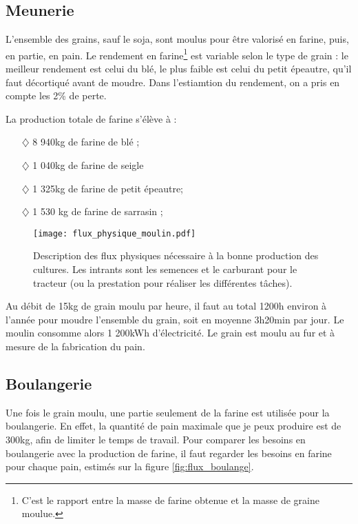 \documentclass{book}
\begin{document}
\subsection{Meunerie}

L'ensemble des grains, sauf le soja, sont moulus pour être valorisé en farine, puis, en partie, en pain. Le rendement en farine\footnote{C'est le rapport entre la masse de farine obtenue et la masse de graine moulue.} est variable selon le type de grain : le meilleur rendement est celui du blé, le plus faible est celui du petit épeautre, qu'il faut décortiqué avant de moudre. Dans l'estiamtion du rendement, on a pris en compte les 2\% de perte.

La production totale de farine s'élève à :
\begin{itemize}

\item[$\diamondsuit$] 8 940kg de farine de blé ; 
\item[$\diamondsuit$] 1 040kg de farine de seigle
\item[$\diamondsuit$] 1 325kg de farine de petit épeautre; 
\item[$\diamondsuit$] 1 530 kg de farine de sarrasin ; 

\end{itemize}

\begin{figure}[h!]
\begin{center}
	\texttt{[image: flux\_physique\_moulin.pdf]}
	\caption{Description des flux physiques nécessaire à la bonne production des cultures. Les intrants sont les semences et le carburant pour le tracteur (ou la prestation pour réaliser les différentes tâches).}
	\label{fig:flux_moulin}
\end{center}
\end{figure}

Au débit de 15kg de grain moulu par heure, il faut au total 1200h environ à l'année pour moudre l'ensemble du grain, soit en moyenne 3h20min par jour. Le moulin consomme alors 1 200kWh d'électricité. Le grain est moulu au fur et à mesure de la fabrication du pain. 

\subsection{Boulangerie}

Une fois le grain moulu, une partie seulement de la farine est utilisée pour la boulangerie. En effet, la quantité de pain maximale que je peux produire est de 300kg, afin de limiter le temps de travail. Pour comparer les besoins en boulangerie avec la production de farine, il faut regarder les besoins en farine pour chaque pain, estimés sur la figure \ref{fig:flux_boulange}. 
\end{document}

